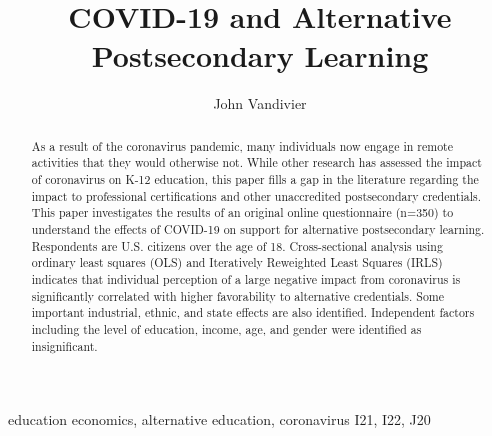 \documentclass[review]{elsarticle}
\begin{document}
\begin{frontmatter}

    \title{
        COVID-19 and Alternative Postsecondary Learning
    }

    \author[mymainaddress]{John Vandivier}
    \address[mymainaddress]{4400 University Dr, Fairfax, VA 22030}

    \begin{abstract}
        As a result of the coronavirus pandemic,
        many individuals now engage in remote activities that they would otherwise not.
        While other research has assessed the impact of coronavirus on K-12 education,
        this paper fills a gap in the literature regarding
        the impact to professional certifications and other unaccredited postsecondary credentials.
        This paper investigates the results of an original online questionnaire (n=350)
        to understand the effects of COVID-19
        on support for alternative postsecondary learning.
        Respondents are U.S. citizens over the age of 18.
        Cross-sectional analysis using ordinary least squares (OLS)
        and Iteratively Reweighted Least Squares (IRLS)
        indicates that individual perception of a large negative impact from coronavirus
        is significantly correlated with
        higher favorability to alternative credentials.
        Some important industrial, ethnic, and state effects are also identified.
        Independent factors including the level of education, income, age, and gender were identified as insignificant.
    \end{abstract}

    \begin{keyword}
        education economics, alternative education, coronavirus             %
        \MSC[2010] I21, I22, J20 %
    \end{keyword}

\end{frontmatter}
\end{document}

